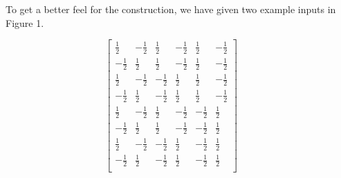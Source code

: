 To get a better feel for the construction, we have given two example inputs in Figure 1.
\begin{figure*}[h]
\begin{center}
$$ 
\begin{bmatrix}
\frac{1}{2} & -\frac{1}{2} & \frac{1}{2} & -\frac{1}{2} & \frac{1}{2} & -\frac{1}{2}  \\
-\frac{1}{2} & \frac{1}{2} & \frac{1}{2} & -\frac{1}{2} & \frac{1}{2} & -\frac{1}{2} \\
\frac{1}{2} & -\frac{1}{2} & -\frac{1}{2} & \frac{1}{2} & \frac{1}{2} & -\frac{1}{2}  \\
-\frac{1}{2} & \frac{1}{2} & -\frac{1}{2} & \frac{1}{2} & \frac{1}{2} & -\frac{1}{2} \\
\frac{1}{2} & -\frac{1}{2} & \frac{1}{2} & -\frac{1}{2} & -\frac{1}{2} & \frac{1}{2}  \\
-\frac{1}{2} & \frac{1}{2} & \frac{1}{2} & -\frac{1}{2} & -\frac{1}{2} & \frac{1}{2}  \\
\frac{1}{2} & -\frac{1}{2} & -\frac{1}{2} & \frac{1}{2} &-\frac{1}{2} & \frac{1}{2} \\
-\frac{1}{2} & \frac{1}{2} & -\frac{1}{2} & \frac{1}{2}  & -\frac{1}{2} & \frac{1}{2} \\
\end{bmatrix} ~~~~~~~~
$$
\end{center}
\end{figure*}
